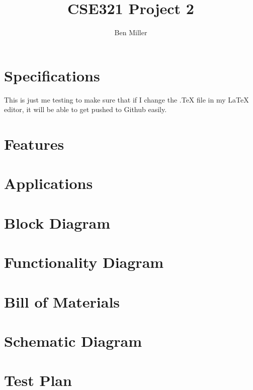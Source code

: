 \documentclass[10pt,a4paper]{article}
\author{Ben Miller}
\title{CSE321 Project 2}
\begin{document}
\maketitle
\pagebreak
\tableofcontents
\pagebreak
\section{Specifications}
This is just me testing to make sure that if I change the .TeX file in my \LaTeX{ }editor, it will be able to get pushed to Github easily.
\pagebreak
\section{Features}
\pagebreak
\section{Applications}
\pagebreak
\section{Block Diagram}
\pagebreak
\section{Functionality Diagram}
\pagebreak
\section{Bill of Materials}
\pagebreak
\section{Schematic Diagram}
\pagebreak
\section{Test Plan}
\end{document}
